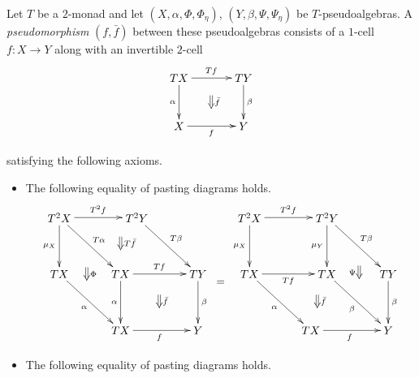 \begin{Defi}
Let $T$ be a $2$-monad and let $(X,\alpha,\Phi,\Phi_\eta)$, $(Y,\beta,\Psi,\Psi_\eta)$ be $T$-pseudoalgebras. A \textit{pseudomorphism} $(f, \bar{f})$ between these pseudoalgebras consists of a $1$-cell $f \colon X \rightarrow Y$ along with an invertible $2$-cell
    \[
        \xy
            (0,0)*+{TX}="00";
            (20,0)*+{TY}="10";
            (0,-15)*+{X}="01";
            (20,-15)*+{Y}="11";
            {\ar^{Tf} "00" ; "10"};
            {\ar^{\beta} "10" ; "11"};
            {\ar_{\alpha} "00" ; "01"};
            {\ar_{f} "01" ; "11"};
            {\ar@{=>}^{\bar{f}} (10,-5.5) ; (10,-9.5)};
        \endxy
    \]

satisfying the following axioms.
    \begin{itemize}
        \item The following equality of pasting diagrams holds.
                \[
        \xy
            (5,0)*+{T^2X}="t3xl";
            (29,0)*+{T^2Y}="t2xl1";
            (5,-17.5)*+{TX}="t2xl2";
            (24,-35)*+{TX}="txl1";
            (48,-17.5)*+{TY}="txl2";
            (48,-35)*+{Y}="xl";
            (24,-17.5)*+{TX}="t2xl3";
            {\ar^{T^2f} "t3xl" ; "t2xl1"};
            {\ar^{T\beta} "t2xl1" ; "txl2"};
            {\ar^{\beta} "txl2" ; "xl"};
            {\ar_{\mu_X} "t3xl" ; "t2xl2"};
            {\ar_{\alpha} "t2xl2" ; "txl1"};
            {\ar_{f} "txl1" ; "xl"};
            {\ar^{T\alpha} "t3xl" ; "t2xl3"};
            {\ar^{Tf} "t2xl3" ; "txl2"};
            {\ar_{\alpha} "t2xl3" ; "txl1"};
            {\ar@{=>}^{T\bar{f}} (24,-6) ; (24,-10)};
            {\ar@{=>}^{\bar{f}} (36,-24) ; (36,-28)};
            {\ar@{=>}^{\Phi} (13.5,-15.5) ; (13.5,-19.5)};
            (64,0)*+{T^2X}="t3xr";
            (88,0)*+{T^2Y}="t2xr1";
            (64,-17.5)*+{TX}="t2xr2";
            (83,-35)*+{TX}="txr1";
            (107,-17.5)*+{TY}="txr2";
            (107,-35)*+{Y}="xr";
            (88,-17.5)*+{TX}="txr3";
            {\ar^{T^2f} "t3xr" ; "t2xr1"};
            {\ar^{T\beta} "t2xr1" ; "txr2"};
            {\ar^{\beta} "txr2" ; "xr"};
            {\ar_{\mu_{X}} "t3xr" ; "t2xr2"};
            {\ar_{\alpha} "t2xr2" ; "txr1"};
            {\ar_{f} "txr1" ; "xr"};
            {\ar_{Tf} "t2xr2" ; "txr3"};
            {\ar_{\beta} "txr3" ; "xr"};
            {\ar_{\mu_Y} "t2xr1" ; "txr3"};
            {\ar@{=>}_{\Psi} (98,-15) ; (98,-19)};
            {\ar@{=>}^{\bar{f}} (85,-24) ; (85,-28)};
            {\ar@{=} (54,-20) ; (56,-20)};
        \endxy
    \]
    \item The following equality of pasting diagrams holds.

\end{itemize}
\end{Defi}
